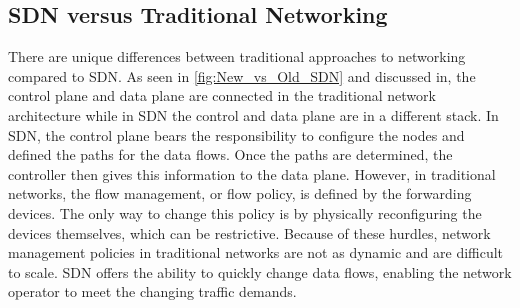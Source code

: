 \documentclass[conference]{IEEEtran}
\begin{document}
 \subsection{SDN versus Traditional Networking}
 

 There are unique differences between traditional approaches to networking compared to SDN. As seen in \cref{fig:New_vs_Old_SDN} and discussed in\cite{haji2021comparison}, the control plane and data plane are connected in the traditional network architecture while in SDN the control and data plane are in a different stack. In SDN, the control plane bears the responsibility to configure the nodes and defined the paths for the data flows. Once the paths are determined, the controller then gives this information to the data plane. However, in traditional networks, the flow management, or flow policy, is defined by the forwarding devices. The only way to change this policy is by physically reconfiguring the devices themselves, which can be restrictive. Because of these hurdles, network management policies in traditional networks are not as dynamic and are difficult to scale. SDN offers the ability to quickly change data flows, enabling the network operator to meet the changing traffic demands. %
  

   
\end{document}
